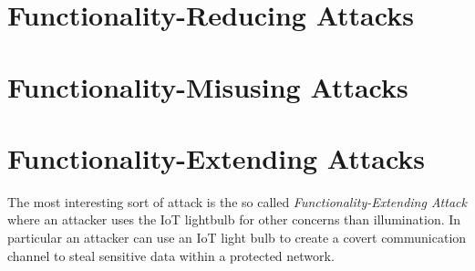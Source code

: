 \documentclass[11pt,a4paper]{article}
\begin{document}
	\section{Functionality-Reducing Attacks}%
	\label{sec:functionality_reducing_attacks}


	\section{Functionality-Misusing Attacks}%
	\label{sec:functionality_misusing_attacks}

	\section{Functionality-Extending Attacks}%
	\label{sec:functionality_extending_attacks}
	The most interesting sort of attack is the so called \textit{Functionality-Extending Attack} where an attacker uses the IoT lightbulb for other concerns than illumination. In particular an attacker can use an IoT light bulb to create a covert communication channel to steal sensitive data within a protected network.\newline



	
	
\end{document}
